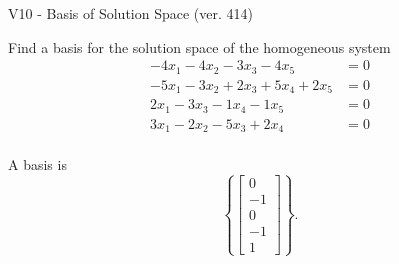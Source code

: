 \begin{exercise}
  \begin{exerciseTitle}V10 - Basis of Solution Space (ver. 414)\end{exerciseTitle}
  \begin{exerciseStatement}
    Find a basis for the solution space of the homogeneous system 
\begin{align*}
 -4 x_ 1 -4 x_ 2 -3 x_ 3 -4 x_ 5 &= 0  \\ 
  -5 x_ 1 -3 x_ 2 + 2 x_ 3 + 5 x_ 4 + 2 x_ 5 &= 0  \\ 
  2 x_ 1 -3 x_ 3 -1 x_ 4 -1 x_ 5 &= 0  \\ 
  3 x_ 1 -2 x_ 2 -5 x_ 3 + 2 x_ 4 &= 0  \\ 
 \end{align*}


 
  \end{exerciseStatement}

  \begin{exerciseAnswer}
   A basis is   
\[\left\{\left[\begin{array}{c}
0 \\
-1 \\
0 \\
-1 \\
1
\end{array}\right]\right\}.\]

  


  \end{exerciseAnswer}
\end{exercise}